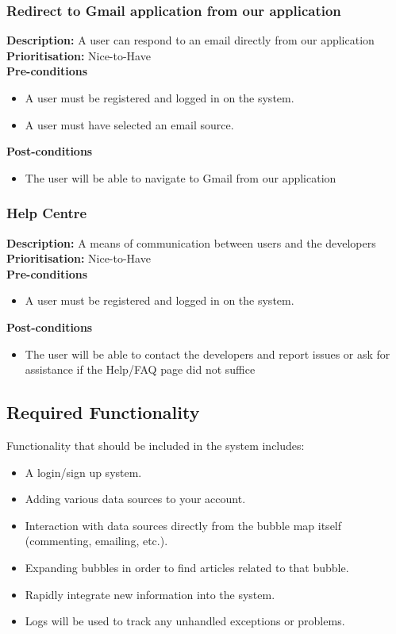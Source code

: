 \documentclass[hidelinks,english]{article}
\begin{document}
    		\subsubsection{Redirect to Gmail application from our application}
				\textbf{Description:}  A user can respond to an email directly from our application\\
			    \textbf{Prioritisation:} Nice-to-Have\\
      			\textbf{Pre-conditions}
			    \begin{itemize}
			        \item A user must be registered and logged in on the system.
			        \item A user must have selected an email source.
			    \end{itemize}
    			\textbf{Post-conditions}
			    \begin{itemize}
			    	\item The user will be able to navigate to Gmail from our application
    			\end{itemize}
    		
    		\subsubsection{Help Centre}
				\textbf{Description:} A means of communication between users and the developers\\
			    \textbf{Prioritisation:} Nice-to-Have\\
      			\textbf{Pre-conditions}
			    \begin{itemize}
			        \item A user must be registered and logged in on the system.
			    \end{itemize}
    			\textbf{Post-conditions}
			    \begin{itemize}
			    	\item The user will be able to contact the developers and report issues or ask for assistance if the Help/FAQ page did not suffice 
    			\end{itemize}
    			
		\subsection{Required Functionality}
			Functionality that should be included in the system includes:
			\begin{itemize}
				\item A login/sign up system. 
				\item Adding various data sources to your account.
				\item Interaction with data sources directly from the bubble map itself (commenting, emailing, etc.).
				\item Expanding bubbles in order to find articles related to that bubble.
				\item Rapidly integrate new information into the system.
				\item Logs will be used to track any unhandled exceptions or problems.
			\end{itemize}
		\newpage
\end{document}

